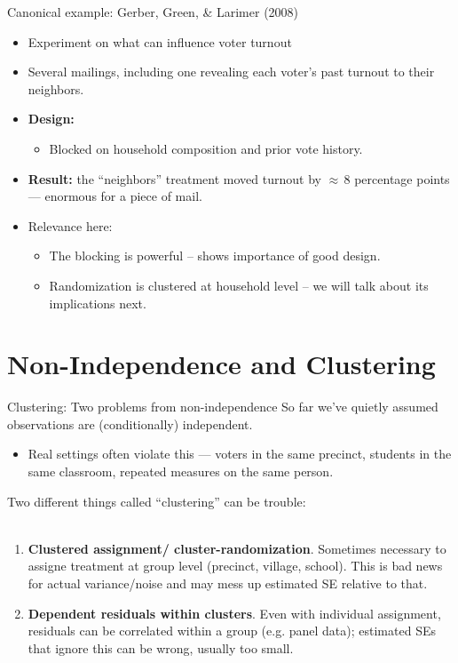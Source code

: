 \documentclass[xcolor=dvipsnames]{beamer}
\begin{document}
\begin{frame}{Canonical example: Gerber, Green, \& Larimer (2008)}
\small
\begin{itemize}
\item<1-> Experiment on what can influence voter turnout
\item<2-> Several mailings, including one revealing each voter's past turnout
  to their neighbors.
\item<3-> \textbf{Design:}
  \begin{itemize}
  \footnotesize
  \item Blocked on household composition and prior vote history.
  \end{itemize}
  \small
\item<4-> \textbf{Result:} the ``neighbors'' treatment moved turnout by
  ${\approx}\,8$ percentage points --- enormous for a piece of mail.
\item<5-> Relevance here:
\footnotesize
\begin{itemize}
\item The blocking is powerful -- shows importance of good design.
\item Randomization is clustered at household level -- we will talk about its implications next. 
\end{itemize}
\end{itemize}
\end{frame}


\section{Non-Independence and Clustering}

\begin{frame}{Clustering: Two problems from non-independence}
\small
{} So far we've quietly assumed observations are (conditionally) independent. \\
\begin{itemize}
\item<2-> Real settings often violate this --- voters in the same precinct, students in
the same classroom, repeated measures on the same person.
\end{itemize}
\medskip
{} Two different things called ``clustering'' can be trouble:\\\
\begin{enumerate}
\item<4-> \textbf{Clustered assignment/ cluster-randomization}. Sometimes necessary to assigne 
treatment at group level (precinct, village, school). This is bad news for actual variance/noise and may mess up estimated SE relative to that. 
\item<5-> \textbf{Dependent residuals within clusters}. Even with individual assignment,
  residuals can be correlated within a group (e.g. panel data); estimated SEs that ignore this
  can be wrong, usually too small.
\end{enumerate}
\end{frame}
\end{document}
